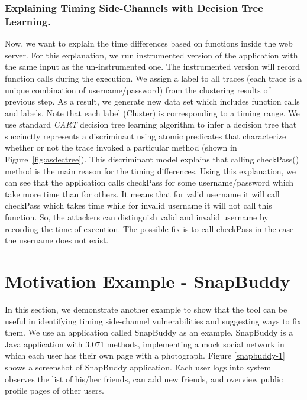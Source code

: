 \documentclass{article}
\begin{document}
\subsubsection*{Explaining Timing Side-Channels with Decision Tree Learning.}
Now, we want to explain the time differences based on functions inside the web server.
For this explanation, we run instrumented version of the application with the same input
as the un-instrumented one. The instrumented version will record function calls during the
execution. We assign a label to all traces (each trace is a unique combination of username/password) from the clustering results of previous step. As a result, we generate new data set which includes function calls and labels. Note that each label (Cluster) is corresponding to a
timing range. We use standard \emph{CART} decision tree learning
algorithm to infer a decision tree that
succinctly represents a discriminant
using atomic predicates that characterize
whether or not the trace invoked a particular method (shown in Figure~\ref{fig:asdectree}).
This discriminant model explains that calling checkPass() method is the main reason for
the timing differences. Using this explanation, we can see that the application calls checkPass
for some username/password which take more time than for others. It means that for valid
username it will call checkPass which takes time while for invalid username it will not call this
function. So, the attackers can distinguish valid and invalid username by recording the time of execution.
The possible fix is to call checkPass in the case the username does not exist. 

\section{Motivation Example - SnapBuddy}
In this section, we demonstrate another example to show that the tool can be useful in
identifying timing side-channel vulnerabilities
and suggesting ways to fix them.
We use an application called
SnapBuddy as an example. SnapBuddy is a Java application with 3,071 methods,
implementing a mock social network in which
each user has their own page with a photograph. Figure \ref{snapbuddy-1} shows
a screenshot of SnapBuddy application. Each user logs into system observes the
list of his/her friends, can add new friends, and overview public profile pages of
other users. 
\end{document}
